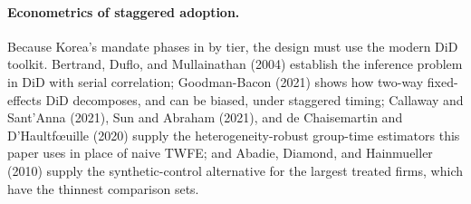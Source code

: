 \documentclass[11pt,a4paper]{article}
\begin{document}
\paragraph{Econometrics of staggered adoption.} Because Korea's mandate phases in by tier, the design must use the modern DiD toolkit. Bertrand, Duflo, and Mullainathan (2004) establish the inference problem in DiD with serial correlation; Goodman-Bacon (2021) shows how two-way fixed-effects DiD decomposes, and can be biased, under staggered timing; Callaway and Sant'Anna (2021), Sun and Abraham (2021), and de Chaisemartin and D'Haultf\oe uille (2020) supply the heterogeneity-robust group-time estimators this paper uses in place of naive TWFE; and Abadie, Diamond, and Hainmueller (2010) supply the synthetic-control alternative for the largest treated firms, which have the thinnest comparison sets.
\end{document}
